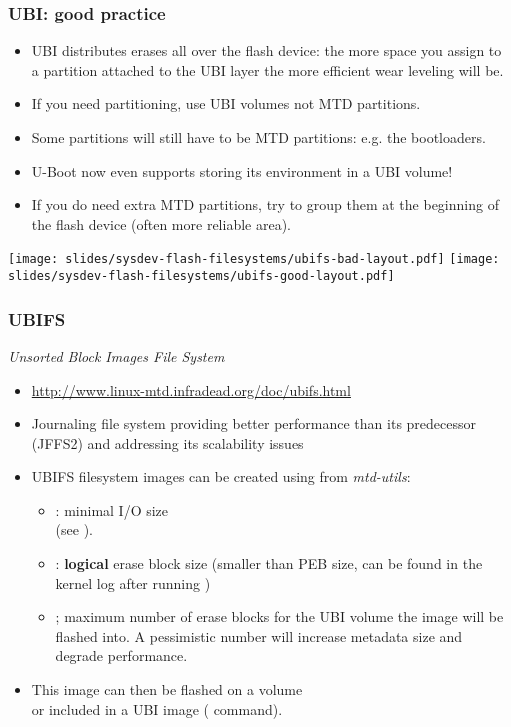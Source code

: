\begin{frame}
  \frametitle{UBI: good practice}
  \begin{itemize}
  \item UBI distributes erases all over the flash device: the more space
    you assign to a partition attached to the UBI layer the more efficient
    wear leveling will be.
  \item If you need partitioning, use UBI volumes not MTD partitions.
  \item Some partitions will still have to be MTD partitions: e.g. the
    bootloaders.
  \item U-Boot now even supports storing its environment in a UBI volume!
  \item If you do need extra MTD partitions, try to group them at the
    beginning of the flash device (often more reliable area).
  \end{itemize}
  \texttt{[image: slides/sysdev-flash-filesystems/ubifs-bad-layout.pdf]}
  \hfill
  \texttt{[image: slides/sysdev-flash-filesystems/ubifs-good-layout.pdf]}
\end{frame}

\begin{frame}
  \frametitle{UBIFS}
  {\em Unsorted Block Images File System}
  \begin{itemize}
  \item \url{http://www.linux-mtd.infradead.org/doc/ubifs.html}
  \item Journaling file system providing better performance than
        its predecessor (JFFS2) and addressing its scalability issues
  \item UBIFS filesystem images can be created using 
        from {\em mtd-utils}:\\
      \begin{itemize}
      \item {}: minimal I/O size\\
                 (see ).
      \item {}: {\bf logical} erase block size (smaller than
                 PEB size, can be found in the kernel log after running
		 )
      \item {}; maximum number of erase blocks for the
        UBI volume the image will be flashed into. A pessimistic
	number will increase metadata size and degrade performance.
      \end{itemize}
  \item This image can then be flashed on a volume\\
        or included in a UBI image ( command).
  \end{itemize}
\end{frame}

